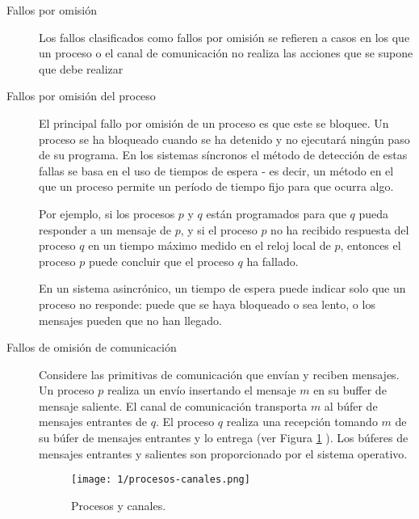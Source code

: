 \begin{description}
	\item[Fallos por omisión] Los fallos clasificados como fallos por omisión se refieren a casos en los que un  proceso o el canal de comunicación no realiza las acciones que se supone que debe realizar
	
	\item [Fallos por omisión del proceso] El principal fallo por omisión de un proceso es que este se bloquee. Un proceso se ha bloqueado cuando se ha detenido y no  ejecutará ning\'un paso de su programa. En los sistemas s\'incronos  el  método de detección de estas fallas se basa en el uso de
	tiempos de espera - es decir, un método en el que un proceso permite un período de tiempo fijo para que  ocurra algo. 
	
	 
	\begin{tcolorbox}
		[colback=red!5!white,colframe=red!75!black,fonttitle=\bfseries,title=Fallas de omisión en sistemas síncronos]
		Por ejemplo, si los procesos $p$ y $q$ están programados para que $q$ pueda responder a un mensaje de $p$, y si el proceso $p$ no ha recibido respuesta del proceso $q$ en un tiempo máximo medido en el reloj local de $p$, entonces el proceso $p$ puede concluir que el proceso $q$ ha fallado.
	\end{tcolorbox}
	
	En un sistema asincrónico, un tiempo de espera puede indicar solo que un proceso no responde: puede que se haya bloqueado o sea lento, o los mensajes pueden que no han llegado.
	
	\item 	[Fallos de omisión de comunicación] Considere las primitivas de comunicación que envían y reciben mensajes. Un proceso $p$ realiza un envío insertando el mensaje $m$ en su buffer de mensaje saliente. El canal de comunicación transporta $m$ al búfer de mensajes entrantes de $q$. El proceso $q$ realiza una recepción tomando $m$ de su búfer de mensajes entrantes y lo entrega (ver Figura \ref{fig:proc-canal} ). Los búferes de mensajes entrantes y salientes son  proporcionado por el sistema operativo.
	
	\begin{figure}%
				\begin{center}
		\texttt{[image: 1/procesos-canales.png]}
		\caption{Procesos y canales.}
		\label{fig:proc-canal}
				\end{center}
	\end{figure}


\end{description}
